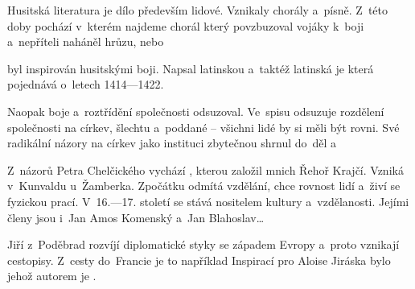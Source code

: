 Husitská literatura je dílo především lidové. Vznikaly chorály a~písně. Z~této doby pochází  
v~kterém najdeme chorál  který povzbuzoval vojáky k~boji a~nepříteli
naháněl hrůzu, nebo 

 byl inspirován husitskými boji. Napsal latinskou  a~taktéž
latinská je  která pojednává o~letech 1414---1422.

Naopak  boje a~roztřídění společnosti odsuzoval. \linebreak[3]
Ve~spisu  odsuzuje rozdělení společnosti na církev, 
šlechtu a~poddané -- všichni lidé by si měli být rovni. Své radikální
názory na církev jako instituci zbytečnou shrnul do~děl 
a~

Z~názorů Petra Chelčického vychází , kterou založil mnich Řehoř Krajčí. Vzniká 
v~Kunvaldu u~Žamberka. Zpočátku odmítá vzdělání, chce rovnost lidí a~živí se fyzickou prací.
V~16.---17. století se stává nositelem kultury a~vzdělanosti. Jejími členy jsou i~Jan Amos Komenský a~Jan Blahoslav\dots{}

Jiří z~Poděbrad rozvíjí diplomatické styky se západem Evropy a~proto vznikají cestopisy.
Z~cesty do~Francie je to například  Inspirací pro Aloise Jiráska bylo
 jehož autorem je .